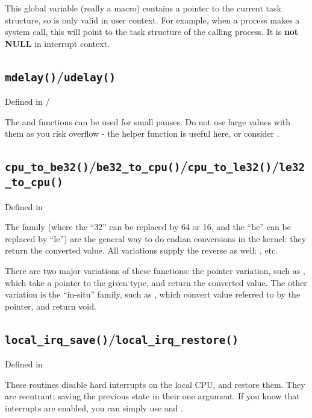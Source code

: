 \documentclass[a4paper,8pt,english]{sphinxmanual}
\begin{document}
This global variable (really a macro) contains a pointer to the current
task structure, so is only valid in user context. For example, when a
process makes a system call, this will point to the task structure of
the calling process. It is \textbf{not NULL} in interrupt context.


\subsection{\texttt{mdelay()}/\texttt{udelay()}}
\label{kernel-hacking/hacking:mdelay-udelay}
Defined in  / 

The  and  functions can be
used for small pauses. Do not use large values with them as you risk
overflow - the helper function  is useful here, or
consider .


\subsection{\texttt{cpu\_to\_be32()}/\texttt{be32\_to\_cpu()}/\texttt{cpu\_to\_le32()}/\texttt{le32\_to\_cpu()}}
\label{kernel-hacking/hacking:cpu-to-be32-be32-to-cpu-cpu-to-le32-le32-to-cpu}
Defined in 

The  family (where the ``32'' can be replaced
by 64 or 16, and the ``be'' can be replaced by ``le'') are the general way
to do endian conversions in the kernel: they return the converted value.
All variations supply the reverse as well:
, etc.

There are two major variations of these functions: the pointer
variation, such as , which take a pointer
to the given type, and return the converted value. The other variation
is the ``in-situ'' family, such as , which
convert value referred to by the pointer, and return void.


\subsection{\texttt{local\_irq\_save()}/\texttt{local\_irq\_restore()}}
\label{kernel-hacking/hacking:local-irq-save-local-irq-restore}
Defined in 

These routines disable hard interrupts on the local CPU, and restore
them. They are reentrant; saving the previous state in their one
 argument. If you know that interrupts are
enabled, you can simply use  and
.
\end{document}
